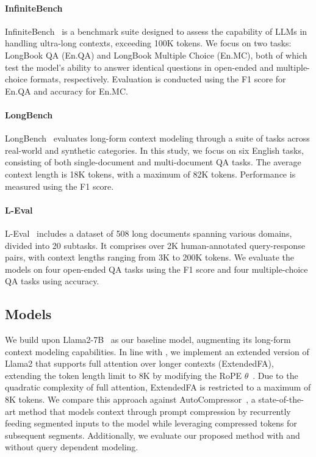 \paragraph{InfiniteBench}
InfiniteBench~\cite{infinitebench} is a benchmark suite designed to assess the capability of LLMs in handling ultra-long contexts, exceeding 100K tokens. We focus on two tasks: LongBook QA (En.QA) and LongBook Multiple Choice (En.MC), both of which test the model's ability to answer identical questions in open-ended and multiple-choice formats, respectively. Evaluation is conducted using the F1 score for En.QA and accuracy for En.MC.

\paragraph{LongBench}
LongBench~\cite{longbench} evaluates long-form context modeling through a suite of tasks across real-world and synthetic categories. In this study, we focus on six English tasks, consisting of both single-document and multi-document QA tasks. The average context length is 18K tokens, with a maximum of 82K tokens. Performance is measured using the F1 score.

\paragraph{L-Eval}
L-Eval~\cite{leval} includes a dataset of 508 long documents spanning various domains, divided into 20 subtasks. It comprises over 2K human-annotated query-response pairs, with context lengths ranging from 3K to 200K tokens. We evaluate the models on four open-ended QA tasks using the F1 score and four multiple-choice QA tasks using accuracy.

\subsection{Models}
We build upon Llama2-7B~\cite{llama2} as our baseline model, augmenting its long-form context modeling capabilities. In line with \cite{autocompressor}, we implement an extended version of Llama2 that supports full attention over longer contexts (ExtendedFA), extending the token length limit to 8K by modifying the RoPE $\theta$~\cite{rope}. Due to the quadratic complexity of full attention, ExtendedFA is restricted to a maximum of 8K tokens. We compare this approach against AutoCompressor~\cite{autocompressor}, a state-of-the-art method that models context through prompt compression by recurrently feeding segmented inputs to the model while leveraging compressed tokens for subsequent segments. Additionally, we evaluate our proposed method with and without query dependent modeling.

